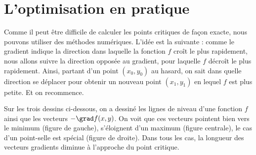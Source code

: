 





\section{L'optimisation en pratique}


Comme il peut être difficile de calculer les points critiques de façon exacte, nous pouvons utiliser des méthodes numériques.
L'idée  est la suivante : comme le gradient indique la direction dans laquelle la fonction $f$ croît le plus rapidement, nous allons suivre la direction opposée au gradient, pour laquelle $f$ décroît le plus rapidement. Ainsi, partant d'un point $(x_0,y_0)$ au hasard, on sait dans quelle direction se déplacer pour obtenir un nouveau point $(x_1,y_1)$ en lequel $f$ est plus petite. Et on recommence.

Sur les trois dessins ci-dessous, on a dessiné les lignes de niveau d'une fonction $f$ ainsi que les vecteurs $-\grad f(x,y)$. On voit que ces vecteurs pointent bien vers le minimum (figure de gauche), s'éloignent d'un maximum (figure centrale), le cas d'un point-selle est spécial (figure de droite). Dans tous les cas, la longueur des vecteurs gradients diminue à l'approche du point critique.


